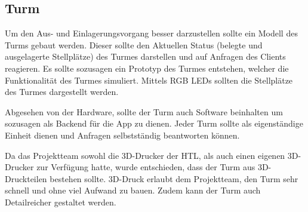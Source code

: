 \subsection{Turm}

Um den Aus- und Einlagerungsvorgang besser darzustellen sollte ein Modell des Turms gebaut werden. Dieser sollte den Aktuellen Status (belegte und ausgelagerte Stellplätze) des Turmes darstellen und auf Anfragen des Clients reagieren. Es sollte sozusagen ein Prototyp des Turmes entstehen, welcher die Funktionalität des Turmes simuliert. Mittels RGB LEDs sollten die Stellplätze des Turmes dargestellt werden.

Abgesehen von der Hardware, sollte der Turm auch Software beinhalten um sozusagen als Backend für die App zu dienen. Jeder Turm sollte als eigenständige Einheit dienen und Anfragen selbstständig beantworten können.

Da das Projektteam sowohl die 3D-Drucker der HTL, als auch einen eigenen 3D-Drucker zur Verfügung hatte, wurde entschieden, dass der Turm aus 3D-Druckteilen bestehen sollte. 3D-Druck erlaubt dem Projektteam, den Turm sehr schnell und ohne viel Aufwand zu bauen. Zudem kann der Turm auch Detailreicher gestaltet werden.